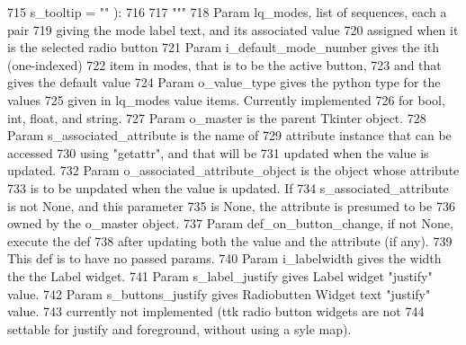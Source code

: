 \begin{DoxyCode}
715             s\_tooltip = \textcolor{stringliteral}{""} ):
716 
717         \textcolor{stringliteral}{"""}
718 \textcolor{stringliteral}{        Param lq\_modes, list of sequences, each a pair}
719 \textcolor{stringliteral}{            giving the mode label text, and its associated value}
720 \textcolor{stringliteral}{            assigned when it is the selected radio button}
721 \textcolor{stringliteral}{        Param i\_default\_mode\_number gives the ith (one-indexed)}
722 \textcolor{stringliteral}{            item in modes, that is to be the active button,}
723 \textcolor{stringliteral}{            and that gives the default value}
724 \textcolor{stringliteral}{        Param o\_value\_type gives the python type for the values}
725 \textcolor{stringliteral}{            given in lq\_modes value items.  Currently implemented}
726 \textcolor{stringliteral}{            for bool, int, float, and string.}
727 \textcolor{stringliteral}{        Param o\_master is the parent Tkinter object.}
728 \textcolor{stringliteral}{                Param s\_associated\_attribute is the name of }
729 \textcolor{stringliteral}{            attribute instance that can be accessed}
730 \textcolor{stringliteral}{            using "getattr", and that will be}
731 \textcolor{stringliteral}{            updated when the value is updated.}
732 \textcolor{stringliteral}{        Param o\_associated\_attribute\_object is the object whose attribute}
733 \textcolor{stringliteral}{            is to be unpdated when the value is updated.  If}
734 \textcolor{stringliteral}{            s\_associated\_attribute is not None, and this parameter}
735 \textcolor{stringliteral}{            is None, the attribute is presumed to be}
736 \textcolor{stringliteral}{            owned by the o\_master object.}
737 \textcolor{stringliteral}{        Param def\_on\_button\_change, if not None, execute the def}
738 \textcolor{stringliteral}{            after updating both the value and the attribute (if any).}
739 \textcolor{stringliteral}{            This def is to have no passed params.}
740 \textcolor{stringliteral}{        Param i\_labelwidth gives the width the the Label widget.}
741 \textcolor{stringliteral}{        Param s\_label\_justify gives Label widget "justify" value.}
742 \textcolor{stringliteral}{        Param s\_buttons\_justify gives Radiobutten Widget text "justify" value.}
743 \textcolor{stringliteral}{                currently not implemented (ttk radio button widgets are not}
744 \textcolor{stringliteral}{                settable for justify and foreground, without using a syle map).}

\end{DoxyCode}
